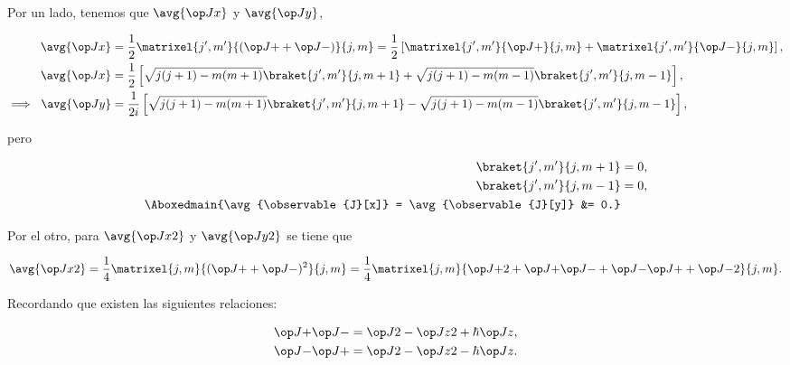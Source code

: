 \documentclass[./../main.tex]{subfiles}
\begin{document}
\begin{exercise}
\begin{solution}
            Por un lado, tenemos que \(\avg{\observable{J}[x]}\) y \(\avg{\observable{J}[y]}\),

            \begin{align*}
                \avg{\observable{J}[x]} &= \frac{1}{2}\matrixel{j^{\prime}, m^{\prime}}{(\observable{J}[+] + \observable{J}[-])}{j, m} = \frac{1}{2}\left[\matrixel{j^{\prime}, m^{\prime}}{\observable{J}[+]}{j, m} + \matrixel{j^{\prime}, m^{\prime}}{\observable{J}[-]}{j, m}\right],\\
                \avg{\observable{J}[x]} &= \frac{1}{2}\left[\sqrt{j(j + 1) - m(m + 1)}\braket{j^{\prime}, m^{\prime}}{j, m + 1} + \sqrt{j(j + 1) - m(m - 1)}\braket{j^{\prime}, m^{\prime}}{j, m - 1}\right],\\
                \implies\ \avg{\observable{J}[y]} &= \frac{1}{2i}\left[\sqrt{j(j + 1) - m(m + 1)}\braket{j^{\prime}, m^{\prime}}{j, m + 1} - \sqrt{j(j + 1) - m(m - 1)}\braket{j^{\prime}, m^{\prime}}{j, m - 1}\right],
            \end{align*}

            \pagebreak
            pero

            \begin{align}
                \braket{j^{\prime}, m^{\prime}}{j, m + 1} &= 0,\nonumber\\
                \braket{j^{\prime}, m^{\prime}}{j, m - 1} &= 0,\nonumber\\
                \Aboxedmain{\avg{\observable{J}[x]} = \avg{\observable{J}[y]} &= 0.}\label{eq:expectation-values-Jx-Jy}
            \end{align}

            Por el otro, para \(\avg{\observable{J}[x][2]}\) y \(\avg{\observable{J}[y][2]}\) se tiene que

            \begin{equation*}
                \avg{\observable{J}[x][2]} = \frac{1}{4}\matrixel{j, m}{(\observable{J}[+] + \observable{J}[-])^{2}}{j, m} = \frac{1}{4}\matrixel{j, m}{\observable{J}[+][2] + \observable{J}[+]\observable{J}[-] + \observable{J}[-]\observable{J}[+] + \observable{J}[-][2]}{j, m}. 
            \end{equation*}

            Recordando que existen las siguientes relaciones:

            \begin{align*}
                \observable{J}[+]\observable{J}[-] &= \observable{J}[][2] - \observable{J}[z][2] + \hbar\observable{J}[z],\\
                \observable{J}[-]\observable{J}[+] &= \observable{J}[][2] - \observable{J}[z][2] - \hbar\observable{J}[z].
            \end{align*}


\end{solution}
\end{exercise}
\end{document}
